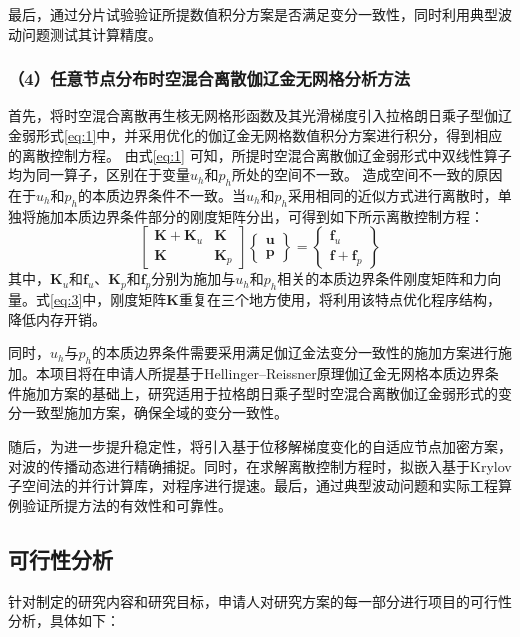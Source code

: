 最后，通过分片试验验证所提数值积分方案是否满足变分一致性，同时利用典型波动问题测试其计算精度。

\subsubsection*{\bfseries （4）任意节点分布时空混合离散伽辽金无网格分析方法}
首先，将时空混合离散再生核无网格形函数及其光滑梯度引入拉格朗日乘子型伽辽金弱形式\eqref{eq:1}中，并采用优化的伽辽金无网格数值积分方案进行积分，得到相应的离散控制方程。
由式\eqref{eq:1} 可知，所提时空混合离散伽辽金弱形式中双线性算子均为同一算子，区别在于变量$u_h$和$p_h$所处的空间不一致。
造成空间不一致的原因在于$u_h$和$p_h$的本质边界条件不一致。当$u_h$和$p_h$采用相同的近似方式进行离散时，单独将施加本质边界条件部分的刚度矩阵分出，可得到如下所示离散控制方程：
\begin{equation}
    \begin{bmatrix} 
        \boldsymbol K + \boldsymbol K_{u} & \boldsymbol K \\
        \boldsymbol K & \boldsymbol K_{p} 
    \end{bmatrix} 
    \begin{Bmatrix}
        \boldsymbol u \\ \boldsymbol p
    \end{Bmatrix} =
    \begin{Bmatrix} \boldsymbol f_u \\ \boldsymbol f + \boldsymbol f_p \end{Bmatrix}
    \label{eq:3} 
\end{equation}
其中，$\boldsymbol K_u$和$\boldsymbol f_u$、$\boldsymbol K_p$和$\boldsymbol f_p$分别为施加与$u_h$和$p_h$相关的本质边界条件刚度矩阵和力向量。式\eqref{eq:3}中，刚度矩阵$\boldsymbol K$重复在三个地方使用，将利用该特点优化程序结构，降低内存开销。

同时，$u_h$与$p_h$的本质边界条件需要采用满足伽辽金法变分一致性的施加方案进行施加。本项目将在申请人所提基于Hellinger--Reissner原理伽辽金无网格本质边界条件施加方案的基础上，研究适用于拉格朗日乘子型时空混合离散伽辽金弱形式的变分一致型施加方案，确保全域的变分一致性。

随后，为进一步提升稳定性，将引入基于位移解梯度变化的自适应节点加密方案，对波的传播动态进行精确捕捉。同时，在求解离散控制方程时，拟嵌入基于Krylov子空间法的并行计算库，对程序进行提速。最后，通过典型波动问题和实际工程算例验证所提方法的有效性和可靠性。

\subsection{可行性分析}
针对制定的研究内容和研究目标，申请人对研究方案的每一部分进行项目的可行性分析，具体如下：

